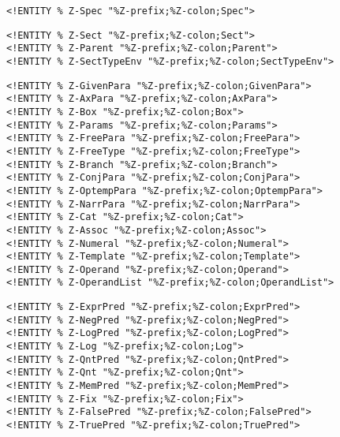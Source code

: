 \documentclass[a4paper,10pt]{article}
\begin{document}
\begin{verbatim}
<!ENTITY % Z-Spec "%Z-prefix;%Z-colon;Spec">
\end{verbatim}
\begin{verbatim}
<!ENTITY % Z-Sect "%Z-prefix;%Z-colon;Sect">
<!ENTITY % Z-Parent "%Z-prefix;%Z-colon;Parent">
<!ENTITY % Z-SectTypeEnv "%Z-prefix;%Z-colon;SectTypeEnv">
\end{verbatim}
\begin{verbatim}
<!ENTITY % Z-GivenPara "%Z-prefix;%Z-colon;GivenPara">
<!ENTITY % Z-AxPara "%Z-prefix;%Z-colon;AxPara">
<!ENTITY % Z-Box "%Z-prefix;%Z-colon;Box">
<!ENTITY % Z-Params "%Z-prefix;%Z-colon;Params">
<!ENTITY % Z-FreePara "%Z-prefix;%Z-colon;FreePara">
<!ENTITY % Z-FreeType "%Z-prefix;%Z-colon;FreeType">
<!ENTITY % Z-Branch "%Z-prefix;%Z-colon;Branch">
<!ENTITY % Z-ConjPara "%Z-prefix;%Z-colon;ConjPara">
<!ENTITY % Z-OptempPara "%Z-prefix;%Z-colon;OptempPara">
<!ENTITY % Z-NarrPara "%Z-prefix;%Z-colon;NarrPara">
<!ENTITY % Z-Cat "%Z-prefix;%Z-colon;Cat">
<!ENTITY % Z-Assoc "%Z-prefix;%Z-colon;Assoc">
<!ENTITY % Z-Numeral "%Z-prefix;%Z-colon;Numeral">
<!ENTITY % Z-Template "%Z-prefix;%Z-colon;Template">
<!ENTITY % Z-Operand "%Z-prefix;%Z-colon;Operand">
<!ENTITY % Z-OperandList "%Z-prefix;%Z-colon;OperandList">
\end{verbatim}
\begin{verbatim}
<!ENTITY % Z-ExprPred "%Z-prefix;%Z-colon;ExprPred">
<!ENTITY % Z-NegPred "%Z-prefix;%Z-colon;NegPred">
<!ENTITY % Z-LogPred "%Z-prefix;%Z-colon;LogPred">
<!ENTITY % Z-Log "%Z-prefix;%Z-colon;Log">
<!ENTITY % Z-QntPred "%Z-prefix;%Z-colon;QntPred">
<!ENTITY % Z-Qnt "%Z-prefix;%Z-colon;Qnt">
<!ENTITY % Z-MemPred "%Z-prefix;%Z-colon;MemPred">
<!ENTITY % Z-Fix "%Z-prefix;%Z-colon;Fix">
<!ENTITY % Z-FalsePred "%Z-prefix;%Z-colon;FalsePred">
<!ENTITY % Z-TruePred "%Z-prefix;%Z-colon;TruePred">
\end{verbatim}
\end{document}
